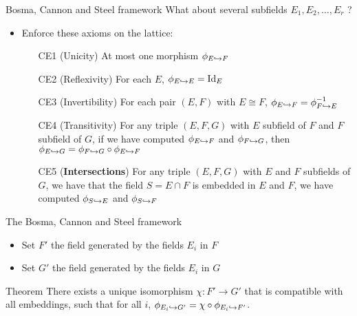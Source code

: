 \documentclass[francais]{beamer}
\def\Id {\ensuremath{\mathrm{Id}}}
\begin{document}
\begin{frame}{Bosma, Cannon and Steel framework}
  What about several subfields $E_1, E_2, \dots, E_r$ ?
  \begin{itemize}
    \item Enforce these axioms on the lattice:
      \begin{itemize}
        \item[CE1] (Unicity) At most one morphism $\phi_{E\hookrightarrow F}$
        \item[CE2] (Reflexivity) For each $E$, $\embed{E}{E}=\Id_E$
        \item[CE3] (Invertibility) For each pair $(E, F)$ with $E\cong F$,
          $\phi_{E\hookrightarrow F}=\phi_{F\hookrightarrow E}^{-1}$ 
        \item[CE4] (Transitivity) For any triple $(E, F, G)$ with $E$
          subfield of $F$ and $F$ subfield of $G$, if we have
         computed $\phi_{E\hookrightarrow F}$ and $\phi_{F\hookrightarrow G}$, then
         $\phi_{E\hookrightarrow G}=\phi_{F\hookrightarrow G}\circ\phi_{E\hookrightarrow F}$
       \item[CE5] (\textbf{Intersections}) For any triple $(E, F, G)$
         with $E$ and $F$ subfields of $G$, we have that the field
         $S=E\cap F$ is embedded in $E$ and $F$, \ie we have computed
         $\phi_{S\hookrightarrow E}$ and $\phi_{S\hookrightarrow F}$
      \end{itemize}
  \end{itemize}
\end{frame}

\begin{frame}{The Bosma, Cannon and Steel framework}
    \begin{figure}
    \centering
  \end{figure}
  \begin{itemize}
    \item Set $F'$ the field generated by the fields $E_i$ in $F$
    \item Set $G'$ the field generated by the fields $E_i$ in $G$
  \end{itemize}
  \begin{block}{Theorem}
There exists a unique isomorphism $\chi:F'\to G'$ that is compatible with all
embeddings, \ie such that for all $i$,
$\phi_{E_i\hookrightarrow G'}=\chi\circ\phi_{E_i\hookrightarrow F'}$.
  \end{block}
\end{frame}
\end{document}
